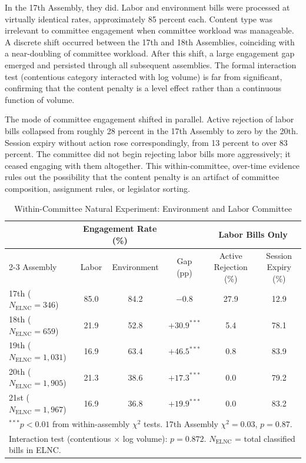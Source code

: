 \documentclass[11pt]{article}
\begin{document}
In the 17th Assembly, they did. Labor and environment bills were processed at virtually identical rates, approximately 85 percent each. Content type was irrelevant to committee engagement when committee workload was manageable. A discrete shift occurred between the 17th and 18th Assemblies, coinciding with a near-doubling of committee workload. After this shift, a large engagement gap emerged and persisted through all subsequent assemblies. The formal interaction test (contentious category interacted with log volume) is far from significant, confirming that the content penalty is a level effect rather than a continuous function of volume.

The mode of committee engagement shifted in parallel. Active rejection of labor bills collapsed from roughly 28 percent in the 17th Assembly to zero by the 20th. Session expiry without action rose correspondingly, from 13 percent to over 83 percent. The committee did not begin rejecting labor bills more aggressively; it ceased engaging with them altogether. This within-committee, over-time evidence rules out the possibility that the content penalty is an artifact of committee composition, assignment rules, or legislator sorting.

\begin{table}[H]
\centering
\caption{Within-Committee Natural Experiment: Environment and Labor Committee}
\label{tab:elnc}
\begin{tabular}{lccccc}
\toprule
& \multicolumn{2}{c}{Engagement Rate (\%)} & & \multicolumn{2}{c}{Labor Bills Only} \\
\cmidrule{2-3} \cmidrule{5-6}
Assembly & Labor & Environment & Gap (pp) & Active Rejection (\%) & Session Expiry (\%) \\
\midrule
17th ($N_{\text{ELNC}} = 346$) & 85.0 & 84.2 & $-0.8$ & 27.9 & 12.9 \\
18th ($N_{\text{ELNC}} = 659$) & 21.9 & 52.8 & $+30.9^{***}$ & 5.4 & 78.1 \\
19th ($N_{\text{ELNC}} = 1{,}031$) & 16.9 & 63.4 & $+46.5^{***}$ & 0.8 & 83.9 \\
20th ($N_{\text{ELNC}} = 1{,}905$) & 21.3 & 38.6 & $+17.3^{***}$ & 0.0 & 79.2 \\
21st ($N_{\text{ELNC}} = 1{,}967$) & 16.9 & 36.8 & $+19.9^{***}$ & 0.0 & 83.2 \\
\bottomrule
\multicolumn{6}{l}{\footnotesize $^{***}p<0.01$ from within-assembly $\chi^2$ tests. 17th Assembly $\chi^2 = 0.03$, $p = 0.87$.} \\
\multicolumn{6}{l}{\footnotesize Interaction test (contentious $\times$ log volume): $p = 0.872$. $N_{\text{ELNC}}$ = total classified bills in ELNC.} \\
\end{tabular}
\end{table}
\end{document}
